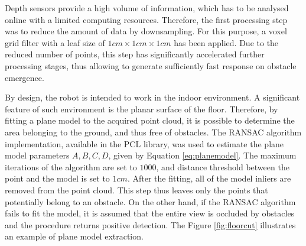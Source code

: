 Depth sensors provide a high volume of information, which has to be analysed online with a limited computing resources. Therefore, the first processing step was to reduce the amount of data by downsampling. For this purpose, a voxel grid filter with a leaf size of $1cm \times 1cm \times 1cm$ has been applied. Due to the reduced number of points, this step has significantly accelerated further processing stages, thus allowing to generate sufficiently fast response on obstacle emergence.


By design, the robot is intended to work in the indoor environment. A significant feature of such environment is the planar surface of the floor. Therefore, by fitting a plane model to the acquired point cloud, it is possible to determine the  area belonging to the ground, and thus free of obstacles. The RANSAC algorithm implementation, available in the PCL library, was used to estimate the plane model parameters $A,B,C,D$, given by Equation \ref{eq:planemodel}. 
The maximum iterations of the algorithm are set to $1000$, and distance threshold between the point and the model is set to $1cm$. After the fitting, all of the model inliers are removed from the point cloud. This step thus leaves only the points that potentially belong to an obstacle. On the other hand, if the RANSAC algorithm fails to fit the model, it is assumed that the entire view is occluded by obstacles and the procedure returns positive detection.  The Figure \ref{fig:floorcut} illustrates an example of plane model extraction.

